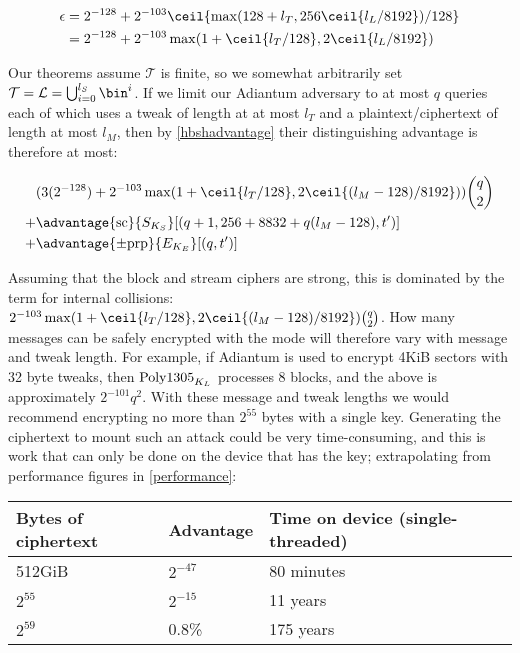 \documentclass[eprint.tex]{subfiles}
\begin{document}
\begin{align*}
\epsilon &= 2^{-128} + 2^{-103}\ceil{\max(128 + l_T, 256\ceil{l_L/8192})/128}  \\
&= 2^{-128} + 2^{-103}\max(1 + \ceil{l_T/128}, 2\ceil{l_L/8192})
\end{align*}\label{adiantumepsilon}

Our theorems assume $\mathcal{T}$ is finite,
so we somewhat arbitrarily set
$\mathcal{T} = \mathcal{L} = \bigcup_{i=0}^{l_S}\bin^i$.
If we limit our Adiantum adversary to at most $q$ queries each of which uses a tweak of length at
at most $l_T$ and a plaintext/ciphertext of length at most $l_M$, then by \autoref{hbshadvantage}
their distinguishing advantage is therefore at most:

\begin{align*}
{}&( 3(2^{-128}) + 2^{-103}\max(1 + \ceil{l_T/128}, 2\ceil{(l_M - 128)/8192}))\binom{q}{2} \\
+{}& \advantage{\mathrm{sc}}{S_{K_S}}[(q + 1, 256 + 8832 + q(l_M - 128), t')] \\
+{}& \advantage{\pm \mathrm{prp}}{E_{K_E}}[(q, t')] \\
\end{align*}

Assuming that the block and stream ciphers are strong, this is dominated by the
term for internal collisions: $2^{-103}\max(1 + \ceil{l_T/128}, 2\ceil{(l_M -
128)/8192})\binom{q}{2}$. How many messages can be safely encrypted with the
mode will therefore vary with message and tweak length. For example, if Adiantum
is used to encrypt 4KiB sectors with 32 byte tweaks, then $\operatorname{Poly1305}_{K_L}$
processes 8 blocks, and the above is approximately $2^{-101}q^2$. With these
message and tweak lengths we would recommend encrypting no more than $2^{55}$
bytes with a single key. Generating the ciphertext to mount such an attack could
be very time-consuming, and this is work that can only be done on the device
that has the key; extrapolating from performance figures in
\autoref{performance}:

\vspace{0.3cm}
\begin{tabular}{llll}
    Bytes of ciphertext & Advantage & Time on device (single-threaded) \\
    \hline
    512GiB & $2^{-47}$ & 80 minutes  \\
    $2^{55}$ & $2^{-15}$ & 11 years \\
    $2^{59}$ & 0.8\% & 175 years &
\end{tabular}
\vspace{0.3cm}

\subbib
\end{document}
